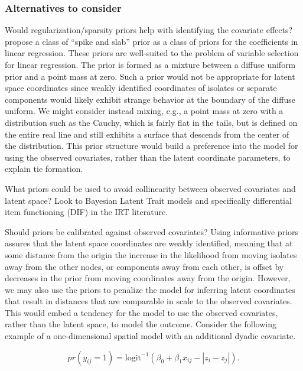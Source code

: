 \documentclass[12pt]{article}
\begin{document}
\subsubsection{Alternatives to consider}

Would regularization/sparsity priors help with identifying the covariate effects? \cite{mitchell1988} propose a class of ``spike and slab'' prior as a class of priors for the coefficients in linear regression.  These priors are well-suited to the problem of variable selection for linear regression. The prior is formed as a mixture between a diffuse uniform prior and a point mass at zero. Such a prior would not be appropriate for latent space coordinates since weakly identified coordinates of isolates or separate components would likely exhibit strange behavior at the boundary of the diffuse uniform. We might consider instead mixing, e.g., a point mass at zero with a distribution such as the Cauchy, which is fairly flat in the tails, but is defined on the entire real line and still exhibits a surface that descends from the center of the distribution. This prior structure would build a preference into the model for using the observed covariates, rather than the latent coordinate parameters, to explain tie formation.

What priors could be used to avoid collinearity between observed covariates and latent space? Look to Bayesian Latent Trait models and specifically differential item functioning (DIF) in the IRT literature.

Should priors be calibrated against observed covariates? Using informative priors assures that the latent space coordinates are weakly identified, meaning that at some distance from the origin the increase in the likelihood from moving isolates away from the other nodes, or components away from each other, is offset by decreases in the prior from moving coordinates away from the origin. However, we may also use the priors to penalize the model for inferring latent coordinates that result in distances that are comparable in scale to the observed covariates. This would embed a tendency for the model to use the observed covariates, rather than the latent space, to model the outcome. Consider the following example of a one-dimensional spatial model with an additional dyadic covariate. 

$$ pr(y_{ij} = 1) = \text{logit}^{-1}(\beta_0 + \beta_1x_{ij} -  |z_i - z_j|).$$
\end{document}
